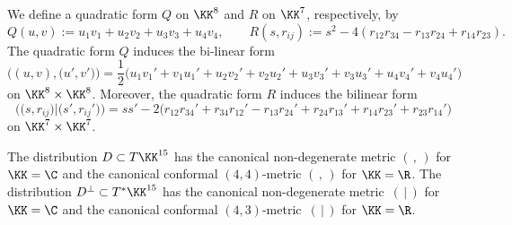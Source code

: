 We define a quadratic form $Q$ on $\KK^8$ and $R$ on $\KK^7$, respectively, by
\[
Q(u, v) := u_1v_1 + u_2v_2 + u_3v_3 + u_4v_4, \qquad R(s, r_{ij}) := s^2 - 4(r_{12}r_{34} - r_{13}r_{24} + r_{14}r_{23}).
\]
The quadratic form $Q$ induces the bi-linear form
\[
\bigl((u, v), \bigl(u', v'\bigr)\bigr) =
\frac{1}{2}\bigl( u_1v_1' + v_1u_1' + u_2v_2' + v_2u_2' + u_3v_3' + v_3u_3' + u_4v_4' + v_4u_4'\bigr)
\]
on $\KK^8 \times \KK^8$. Moreover, the quadratic form $R$ induces the bilinear form
\[
\bigl(\bigl(s, r_{ij}\bigr) \vert \bigl(s', r_{ij}'\bigr)\bigr) = ss' - 2\bigl( r_{12}r_{34}' + r_{34}r_{12}' - r_{13}r_{24}' + r_{24}r_{13}' + r_{14}r_{23}' + r_{23}r_{14}'\bigr)
\]
on $\KK^7\times \KK^7$.

\begin{Corollary}
\label{Conformal-metrics}
The distribution $D \subset T\KK^{15}$ has the canonical non-degenerate metric $(\, ,\, )$ for ${\KK = \C}$ and
the canonical conformal $(4, 4)$-metric $(\, ,\, )$ for $\KK = \R$.
The distribution ${D^\perp \subset T^*\KK^{15}}$ has the canonical non-degenerate metric~$(\, \vert \, )$ for $\KK = \C$ and
the canonical conformal $(4, 3)$-metric~$(\, \vert \, )$ for $\KK = \R$.
\end{Corollary}

